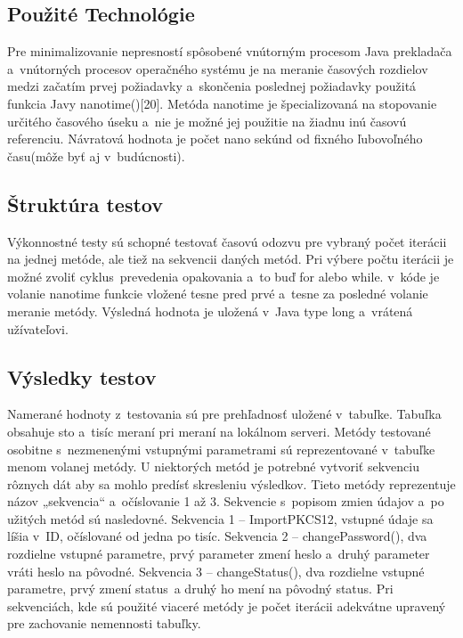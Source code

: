 \documentclass[
  printed, %
  notable,   %
  nolof,     %
    oneside,       %
  nolot,     %
]{fithesis3}
\begin{document}
\subsection{Použité Technológie}
Pre minimalizovanie nepresností spôsobené vnútorným procesom Java prekladača a~vnútorných procesov operačného systému je na meranie časových rozdielov medzi začatím prvej požiadavky a~skončenia poslednej požiadavky použitá funkcia Javy nanotime()[20]. Metóda nanotime je špecializovaná na stopovanie určitého časového úseku a~nie je možné jej použitie na žiadnu inú časovú referenciu. Návratová hodnota je počet nano sekúnd od fixného ľubovoľného času(môže byť aj v~budúcnosti).
\subsection{Štruktúra testov}
Výkonnostné testy sú schopné testovať časovú odozvu pre vybraný počet iterácii na jednej metóde, ale tiež na sekvencii daných metód. Pri výbere počtu iterácii je možné zvoliť cyklus~prevedenia opakovania a~to buď for alebo while.  v~kóde je  volanie nanotime funkcie vložené tesne pred prvé a~tesne za posledné volanie meranie metódy. Výsledná hodnota je uložená v~Java type long a~vrátená užívateľovi.
\subsection{Výsledky testov}
Namerané hodnoty z~testovania sú pre prehľadnosť uložené v~tabuľke. Tabuľka obsahuje sto a~tisíc meraní pri meraní na lokálnom serveri. Metódy testované osobitne s~nezmenenými vstupnými parametrami sú reprezentované v~tabuľke menom volanej metódy. U niektorých metód je potrebné vytvoriť sekvenciu rôznych dát aby sa mohlo predísť skresleniu výsledkov. Tieto metódy reprezentuje názov „sekvencia“ a~očíslovanie 1 až 3. Sekvencie s~popisom zmien údajov  a~po užitých metód sú nasledovné.
Sekvencia 1 – ImportPKCS12, vstupné údaje sa líšia v~ID, očíslované od jedna po tisíc.
Sekvencia 2 – changePassword(), dva rozdielne vstupné parametre, prvý parameter zmení heslo  a~druhý parameter vráti heslo na pôvodné.
Sekvencia 3 – changeStatus(), dva rozdielne vstupné parametre, prvý zmení status~a druhý ho mení na pôvodný status. 
Pri sekvenciách, kde sú použité viaceré metódy je počet iterácii adekvátne upravený pre zachovanie nemennosti tabuľky. 
\end{document}
